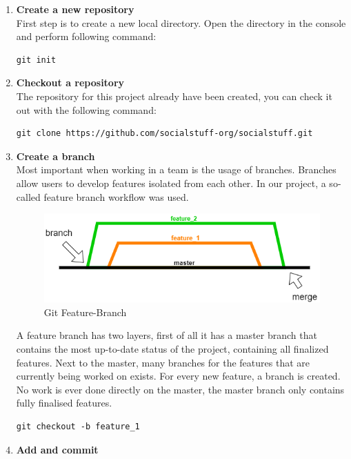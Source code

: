 \begin{enumerate}
	\item \textbf{Create a new repository} \\
	First step is to create a new local directory. Open the directory in the console and perform following command:
	\begin{lstlisting}[label={lst:lstlisting2}]
		git init
	\end{lstlisting}
	\item \textbf{Checkout a repository} \\
	The repository for this project already have been created, you can check it out with the following command:
	\begin{lstlisting}[label={lst:lstlisting2}]
		git clone https://github.com/socialstuff-org/socialstuff.git
	\end{lstlisting}
	\item \textbf{Create a branch} \\
	Most important when working in a team is the usage of branches. Branches allow users to develop features isolated from each other. In our project, a so-called feature branch workflow was used. 
	\begin{figure}[h]
		\centering
		\includegraphics[width=1.0\textwidth]{./images/git_branching}
		\caption{Git Feature-Branch}
		\label{fig:gitbranching}
	\end{figure}
	A feature branch has two layers, first of all it has a master branch that contains the most up-to-date status of the project, containing all finalized features. Next to the master, many branches for the features that are currently being worked on exists. For every new feature, a branch is created. No work is ever done directly on the master, the master branch only contains fully finalised features.
	\begin{lstlisting}[label={lst:lstlisting2}]
		git checkout -b feature_1
	\end{lstlisting}
	\item \textbf{Add and commit} \\
	\begin{figure}[h]

\end{figure}
\end{enumerate}
